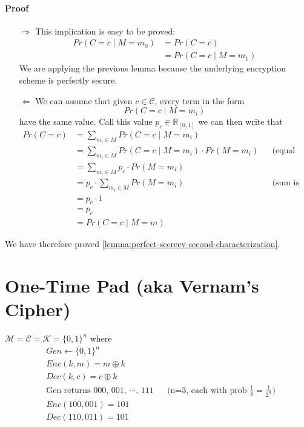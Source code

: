 \documentclass[../main]{subfiles}
\begin{document}
\newpage

\paragraph{Proof}
    \begin{enumerate}
        \item[$\Rightarrow{}$]
        This implication is easy to be proved:
            \begin{align*}
                Pr(C=c \mid M=m_0) &= Pr(C=c) \\
                &= Pr(C=c \mid M=m_1)
            \end{align*}
        We are applying the previous lemma because the underlying encryption scheme is perfectly secure.
        \item[$\Leftarrow{}$]
        We can assume that given $c \in \mathcal{C}$, every term in the form
        \[
            Pr(C=c \mid M=m_i)
        \]
        have the same value. Call this value $p_c \in \mathbb{R}_{[0, 1]}$ we can then write that
            \begin{align*}
                Pr(C=c) &= \sum_{m_i \in M} Pr(C=c \mid M=m_i) \\
                &= \sum_{m_i \in M} Pr(C=c \mid M=m_i) \cdot Pr(M=m_i) && \text{(equal by prob theory)} \\
                &= \sum_{m_i \in M} p_c \cdot Pr(M=m_i) \\
                &= p_c \cdot \sum_{m_i \in M} Pr(M=m_i) && \text{(sum is equal to 1)} \\
                &= p_c \cdot 1 \\
                &= p_c \\
                &= Pr(C=c \mid M=m)
            \end{align*}
    \end{enumerate}

    We have therefore proved \ref{lemma:perfect-secrecy-second-characterization}.
\section{One-Time Pad (aka Vernam's Cipher)}
\begin{definition}[OTP]
    $\mathcal{M} = \mathcal{C} = \mathcal{K} = \{0, 1\}^n$ where
    \begin{align*}
        & Gen \leftarrow{} \{0, 1\}^n \\
        & Enc(k,m) = m \oplus k \\
        & Dec(k,c) = c \oplus k \\
        & \text{Gen returns 000, 001, $\cdots$, 111} && \text{(n=3, each with prob $\frac{1}{8}=\frac{1}{2^n}$)} \\
        & Enc(100, 001) = 101 \\
        & Dec(110, 011) = 101
    \end{align*}
\end{definition}
\end{document}
